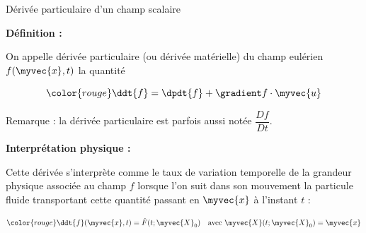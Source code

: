 \begin{frame}{Dérivée particulaire d'un champ scalaire}

\small

\textbf{Définition :} \medskip

On appelle \textcolor{vert}{dérivée particulaire} (ou dérivée matérielle) 
du champ eulérien $f(\myvec{x}, t)$ la quantité

\[
	\color{rouge}
	\ddt{f} 
	=
	\dpdt{f} +  \gradient f \cdot \myvec{u}
\]

\medskip

Remarque : la dérivée particulaire est parfois aussi notée $\dfrac{Df}{Dt}$.

\bigskip
\pause

\textbf{Interprétation physique :} \medskip

Cette dérivée s'interprète comme le taux de variation temporelle de la grandeur physique associée au champ $f$ lorsque l'on suit dans son mouvement la particule fluide transportant cette quantité 
passant en $\myvec{x}$ à l'instant $t$ :

\[
	{\color{rouge}
	\ddt{f}(\myvec{x},t) = \dot{F}(t; \myvec{X}_0)}
	\quad \mbox{avec $\myvec{X}(t; \myvec{X}_0) = \myvec{x}$} 
\]

\vspace{20mm}

\end{frame}


